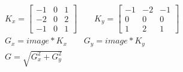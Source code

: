 \documentclass[10pt,preview]{standalone}
\begin{document}
%
\vspace*{-1em}
\begin{align*}%
  &K_x=
  \begin{bmatrix}%
    -1 & 0 & 1 \\
    -2 & 0 & 2 \\
    -1 & 0 & 1
  \end{bmatrix}
  \qquad K_y=
  \begin{bmatrix}
    -1 & -2 & -1 \\
    0 & 0 & 0 \\
    1 & 2 & 1 
  \end{bmatrix}\\
  & G_x = \mathit{image} * K_x \qquad G_y = \mathit{image} * K_y \\
  & G = \sqrt{ G_x^2 + G_y^2 }
\end{align*}
\end{document}
